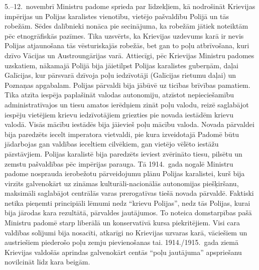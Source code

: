 \documentclass[twoside,a5paper,12pt,fleqn,openany]{extbook}
\begin{document}
5.--12.~novembrī Ministru padome sprieda par līdzekļiem, kā nodrošināt Krievijas impērijas un Polijas karalistes vienotību, vietējo pašvaldību Polijā un tās robežām. Sēdes dalībnieki nonāca pie secinājuma, ka robežām jātiek noteiktām pēc etnogrāfiskās pazīmes. Tika uzsvērts, ka Krievijas uzdevums karā ir nevis Polijas atjaunošana tās vēsturiskajās robežās, bet gan to poļu atbrīvošana, kuri dzīvo Vācijas un Austroungārijas varā. Attiecīgi, pēc Krievijas Ministru padomes uzskatiem, nākamajā Polijā bija jāietilpst Polijas karalistes guberņām, daļai Galīcijas, kur pārsvarā dzīvoja poļu iedzīvotāji (Galīcijas rietumu daļai) un Poznaņas apgabalam. Polijas pārvaldi bija jābūvē uz ticības brīvības pamatiem. Tika atzīta iespēja paplašināt valodas autonomiju, atzīstot nepieciešamību administratīvajos un tiesu amatos ierēdņiem zināt poļu valodu, reizē saglabājot iespēju vietējiem krievu iedzīvotājiem griezties pie novada iestādēm krievu valodā. Visās mācību iestādēs bija jāievieš poļu mācību valoda. Novada pārvaldei bija paredzēts iecelt imperatora vietvaldi, pie kura izveidotajā Padomē būtu jādarbojas gan valdības ieceltiem cilvēkiem, gan vietējo vēlēto iestāžu pārstāvjiem. Polijas karalistē bija paredzēts ieviest zvērināto tiesu, pilsētu un zemstu pašvaldības pēc impērijas parauga. Tā 1914.~gada nogalē Ministru padome nosprauda ierobežotu pārveidojumu plānu Polijas karalistei, kurš bija virzīts galvenokārt uz zināmas kulturāli-nacionālās autonomijas piešķiršanu, maksimāli saglabājot centrālās varas prerogatīvas tiešā novada pārvaldē. Faktiski netika pieņemti principiāli lēmumi nedz ``krievu Polijas'', nedz tās Polijas, kurai bija jārodas kara rezultātā, pārvaldes jautājumos. To noteica domstarpības pašā Ministru padomē starp liberālā un konservatīvā kursa piekritējiem. Visi cara valdības solījumi bija nosacīti, atkarīgi no Krievijas uzvaras karā, vāciešiem un austriešiem piederošo poļu zemju pievienošanas tai. 1914./1915.~gada ziemā Krievijas valdošās aprindas galvenokārt centās ``poļu jautājuma'' apspriešanu novilcināt līdz kara beigām.

\end{document}
